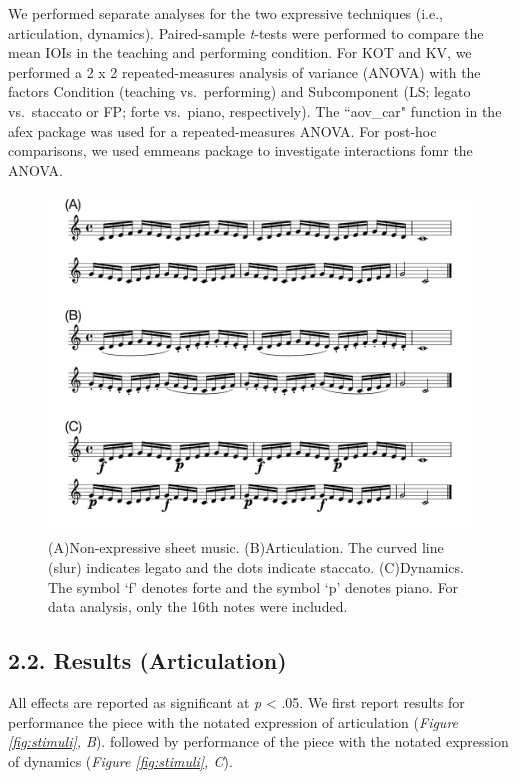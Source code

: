 \documentclass[
  english,
  man,floatsintext]{apa6}
\begin{document}
We performed separate analyses for the two expressive techniques (i.e., articulation, dynamics). Paired-sample \emph{t}-tests were performed to compare the mean IOIs in the teaching and performing condition. For KOT and KV, we performed a 2 x 2 repeated-measures analysis of variance (ANOVA) with the factors Condition (teaching vs.~performing) and Subcomponent (LS; legato vs.~staccato or FP; forte vs.~piano, respectively). The ``aov\_car" function in the afex package was used for a repeated-measures ANOVA. For post-hoc comparisons, we used emmeans package to investigate interactions fomr the ANOVA.

\begin{figure}
\includegraphics[width=1\linewidth]{manuscript_files/figure-latex/stim-1-1} \caption{\label{fig:stimuli}(A)Non-expressive sheet music. (B)Articulation. The curved line (slur) indicates legato and the dots indicate staccato. (C)Dynamics. The symbol `f' denotes forte and the symbol `p' denotes piano. For data analysis, only the 16th notes were included.}\label{fig:stim-1}
\end{figure}

\newpage

\hypertarget{results-articulation}{%
\subsection{2.2. Results (Articulation)}\label{results-articulation}}

All effects are reported as significant at \emph{p} \textless{} .05. We first report results for performance the piece with the notated expression of articulation (\emph{Figure \ref{fig:stimuli}, B}). followed by performance of the piece with the notated expression of dynamics (\emph{Figure \ref{fig:stimuli}, C}).
\end{document}
